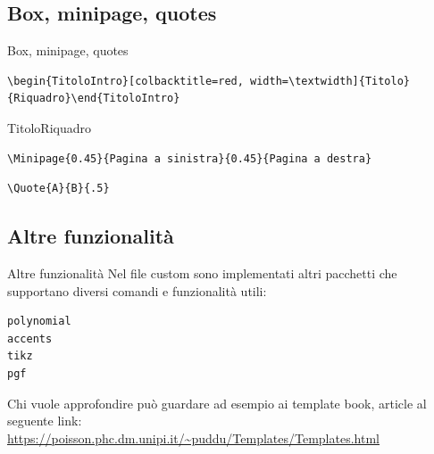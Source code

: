 \documentclass[aspectratio=169, compress]{beamer}
\begin{document}
\subsection{Box, minipage, quotes}
\begin{frame}[fragile, shrink=10]{Box, minipage, quotes}
\begin{verbatim}
\begin{TitoloIntro}[colbacktitle=red, width=\textwidth]{Titolo}
{Riquadro}\end{TitoloIntro}	
\end{verbatim}
\begin{TitoloIntro}[colbacktitle=red, width=\textwidth]{Titolo}{Riquadro}\end{TitoloIntro}
\begin{verbatim}\Minipage{0.45}{Pagina a sinistra}{0.45}{Pagina a destra}\end{verbatim}
\vspace{-2cm}
\begin{verbatim}\Quote{A}{B}{.5}\end{verbatim}
\end{frame}
\subsection{Altre funzionalità}
\begin{frame}[fragile]{Altre funzionalità}
Nel file custom sono implementati altri pacchetti che supportano diversi comandi e funzionalità utili:
\begin{verbatim}polynomial
accents
tikz
pgf\end{verbatim}
Chi vuole approfondire può guardare ad esempio ai template book, article al seguente link:\newline
\url{https://poisson.phc.dm.unipi.it/~puddu/Templates/Templates.html}
\end{frame}
\end{document}
